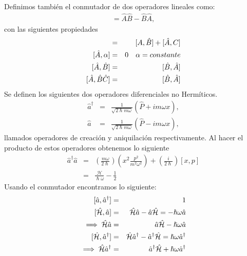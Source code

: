 \documentclass[letterpaper,12pt,oneside]{book}
\begin{document}
Definimos tambi\'en el conmutador de dos operadores lineales como: 
%
\begin{eqnarray}
[{\hat {A}},{\hat {B}}]={\hat {A}}{\hat {B}}-{\hat {B}}{\hat {A}},
\end{eqnarray}
%
con las siguientes propiedades
%
\begin{eqnarray}
[\hat A, \hat B + \hat C] &=& [A,\hat B] + [\hat A, C]\\
\protect [\hat A, \alpha] &=& 0 \quad \alpha=constante\\
\protect[\hat A, \hat B] &=& [\hat B, \hat A]\\
\protect[\hat A, \hat B\hat C] &=& [\hat B, \hat A]\\
\end{eqnarray}
%
Se definen los siguientes dos operadores diferenciales no Herm\'iticos. 
%
\begin{eqnarray}
\hat a^\dagger &=& \frac{1}{\sqrt{2\hslash m\omega}}(\hat P + im\omega x),\\
\hat a&=& \frac{1}{\sqrt{2\hslash m\omega}}(\hat P - im\omega x),
\end{eqnarray}
%
llamados operadores de creaci\'on y aniquilaci\'on respectivamente. Al hacer el producto de estos operadores obtenemos lo siguiente
%
\begin{eqnarray}
\hat a^\dagger \hat a &=& \left(\frac{m\omega}{2\hslash}\right) \left(x^2 \frac{p^2}{m^2\omega^2}\right) + \left(\frac{i}{2\hslash}\right)[x,p]\\
&=&\frac{\mathcal{H}}{\hslash\omega}-\frac{1}{2}
\end{eqnarray}
%
%
%
Usando el conmutador encontramos lo siguiente:
%
\begin{eqnarray}
\protect [\hat a, \hat a^\dagger]&=& 1\\
\protect [\mathcal{\hat H}, \hat a] &=& \mathcal{\hat H}\hat a - \hat a\mathcal{\hat H} = -\hslash \omega \hat a\\
\implies \mathcal{\hat H}\hat a &=& \hat a \mathcal{\hat H} - \hslash \omega \hat a\\
\protect [\mathcal{\hat H}, \hat a^\dagger] &=& \mathcal{\hat H}\hat a^\dagger - \hat a^\dagger\mathcal{\hat H} = \hslash \omega \hat a^\dagger\\
\implies \mathcal{\hat H}\hat a^\dagger &=& \hat a^\dagger \mathcal{\hat H} + \hslash \omega \hat a^\dagger 
\end{eqnarray}
\end{document}
